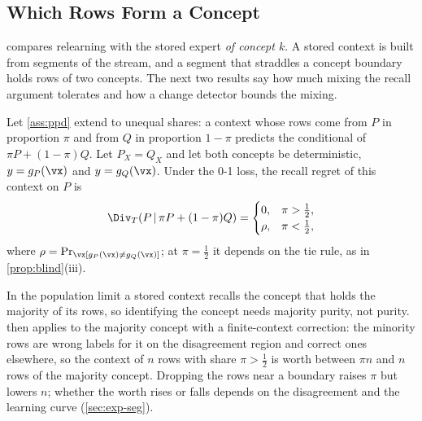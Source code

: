 
\subsection{Which Rows Form a Concept}
\label{sec:th-seg}

 compares relearning with the stored expert \emph{of concept $k$}. A stored context is built from
segments of the stream, and a segment that straddles a concept boundary holds rows of two concepts. The next two
results say how much mixing the recall argument tolerates and how a change detector bounds the mixing.

\begin{proposition}\label{prop:purity}
Let \cref{ass:ppd} extend to unequal shares: a context whose rows come from $P$ in proportion $\pi$ and from $Q$ in
proportion $1-\pi$ predicts the conditional of $\pi P+(1-\pi)Q$. Let $P_X=Q_X$ and let both concepts be
deterministic, $y=g_P(\vx)$ and $y=g_Q(\vx)$. Under the 0-1 loss, the recall regret of this context on $P$ is
\[
  \Div_T(P\,|\,\pi P+(1-\pi)Q)=
  \begin{cases}
    0, & \pi>\tfrac12,\\
    \rho, & \pi<\tfrac12,
  \end{cases}
\]
where $\rho=\Pr_\vx[g_P(\vx)\ne g_Q(\vx)]$; at $\pi=\tfrac12$ it depends on the tie rule, as in
\cref{prop:blind}(iii).
\end{proposition}

\begin{remark}
In the population limit a stored context recalls the concept that holds the majority of its rows, so
identifying the concept needs majority purity, not purity.  then applies to the majority concept
with a finite-context correction: the minority rows are wrong labels for it on the disagreement region and correct
ones elsewhere, so the context of $n$ rows with share $\pi>\tfrac12$ is worth between $\pi n$ and $n$ rows of the
majority concept. Dropping the rows near a boundary raises $\pi$ but lowers $n$; whether the worth rises or falls
depends on the disagreement and the learning curve (\cref{sec:exp-seg}).
\end{remark}


